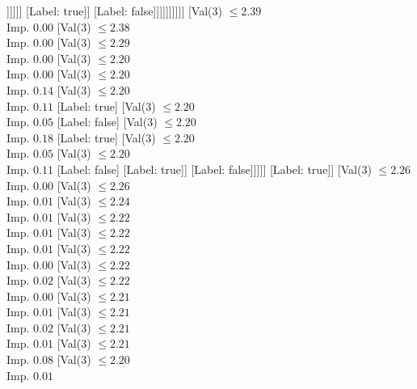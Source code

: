 \documentclass[margin=10pt]{standalone}
\begin{document}
\begin{forest}
																					[Label: false]
																					[Val($3$) $ \leq 2.19$ \\ Imp. $0.38$
																						[Label: true]
																						[Label: false]]]]]]
																	[Label: true]]
																[Label: false]]]]]]]]]]
							[Val($3$) $ \leq 2.39$ \\ Imp. $0.00$
								[Val($3$) $ \leq 2.38$ \\ Imp. $0.00$
									[Val($3$) $ \leq 2.29$ \\ Imp. $0.00$
										[Val($3$) $ \leq 2.20$ \\ Imp. $0.00$
											[Val($3$) $ \leq 2.20$ \\ Imp. $0.14$
												[Val($3$) $ \leq 2.20$ \\ Imp. $0.11$
													[Label: true]
													[Val($3$) $ \leq 2.20$ \\ Imp. $0.05$
														[Label: false]
														[Val($3$) $ \leq 2.20$ \\ Imp. $0.18$
															[Label: true]
															[Val($3$) $ \leq 2.20$ \\ Imp. $0.05$
																[Val($3$) $ \leq 2.20$ \\ Imp. $0.11$
																	[Label: false]
																	[Label: true]]
																[Label: false]]]]]
												[Label: true]]
											[Val($3$) $ \leq 2.26$ \\ Imp. $0.00$
												[Val($3$) $ \leq 2.26$ \\ Imp. $0.01$
													[Val($3$) $ \leq 2.24$ \\ Imp. $0.01$
														[Val($3$) $ \leq 2.22$ \\ Imp. $0.01$
															[Val($3$) $ \leq 2.22$ \\ Imp. $0.01$
																[Val($3$) $ \leq 2.22$ \\ Imp. $0.00$
																	[Val($3$) $ \leq 2.22$ \\ Imp. $0.02$
																		[Val($3$) $ \leq 2.22$ \\ Imp. $0.00$
																			[Val($3$) $ \leq 2.21$ \\ Imp. $0.01$
																				[Val($3$) $ \leq 2.21$ \\ Imp. $0.02$
																					[Val($3$) $ \leq 2.21$ \\ Imp. $0.01$
																						[Val($3$) $ \leq 2.21$ \\ Imp. $0.08$
																							[Val($3$) $ \leq 2.20$ \\ Imp. $0.01$

\end{forest}
\end{document}
